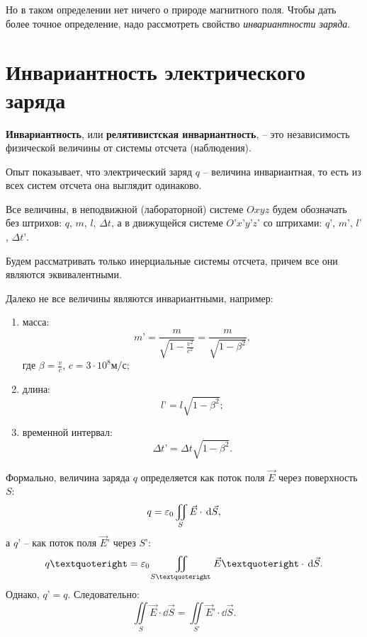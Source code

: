 	Но в таком определении нет ничего о природе магнитного поля. Чтобы дать
    более точное определение, надо рассмотреть свойство \textit{инвариантности
    заряда}.

\section{Инвариантность электрического заряда}

	\begin{definition}
        \textbf{Инвариантность}, или \textbf{релятивистская инвариантность}, --
        это независимость физической величины от системы отсчета (наблюдения).
	\end{definition}
	
	Опыт показывает, что электрический заряд \( q \) -- величина инвариантная,
    то есть из всех систем отсчета она выглядит одинаково.
	
	\begin{remark}
        Все величины, в неподвижной (лабораторной) системе \( Oxyz \) будем 
        обозначать без штрихов: \( q \), \( m \), \( l \), \( \Delta t \), а в
        движущейся системе \( O’x’y’z’ \) со штрихами: \( q’ \), \( m’ \),
        \( l’ \), \( \Delta t’ \).
	\end{remark}
	
    \begin{remark}
        Будем рассматривать только инерциальные системы отсчета, причем все они
        являются эквивалентными.
	\end{remark}
	
	Далеко не все величины являются инвариантными, например:
	\begin{enumerate}
        \item масса:
        \[
            m’ = \frac{m}{\sqrt{1 - \frac{v^2}{c^2}}} =
            \frac{m}{\sqrt{1 - \beta^2}},
        \]
        где \( \beta = \frac{v}{c} \), \( c = 3\cdot10^8 \)м/с;
        
        \item длина:
        \[
            l’ = l\sqrt{1 - \beta^2};
        \]
        
        \item временной интервал:
        \[
            \Delta t’ = \Delta t\sqrt{1 - \beta^2}.
        \]
	\end{enumerate}
	
	Формально, величина заряда \( q \) определяется как поток поля \( \vec{E} \)
    через поверхность \( S \):
	\[
        q = \varepsilon_0\iint\limits_S \vec{E}\cdot\,\mathrm{d}\vec{S},
    \]
	а \( q’ \) -- как поток поля \( \vec{E}{’} \) через \( S’ \):
	\[
        q’ = \Ezero\iint\limits_{S’} \vec{E}{’}\cdot\dd\vec{S}.
    \]
	Однако, \( q’ = q \). Следовательно:
	\[
        \iint\limits_S \vec{E}\cdot\dd\vec{S} =
        \iint\limits_{S’} \vec{E}{’}\cdot\dd\vec{S}.
    \]
	
